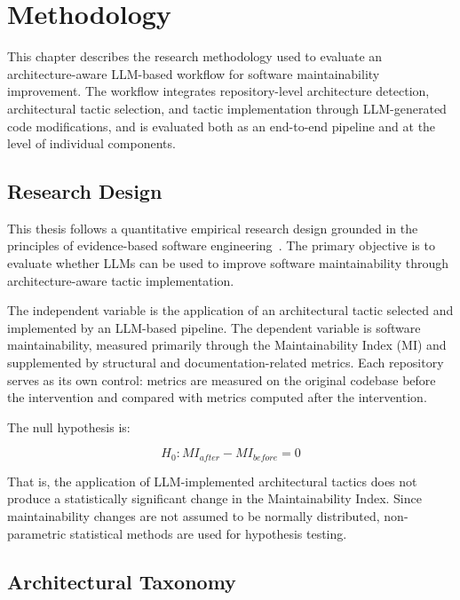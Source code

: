 \chapter{Methodology}
\label{chap:met}

This chapter describes the research methodology used to evaluate an architecture-aware LLM-based workflow for software maintainability improvement. The workflow integrates repository-level architecture detection, architectural tactic selection, and tactic implementation through LLM-generated code modifications, and is evaluated both as an end-to-end pipeline and at the level of individual components.

\section{Research Design}

This thesis follows a quantitative empirical research design grounded in the principles of evidence-based software engineering~\cite{bass2021software}. The primary objective is to evaluate whether LLMs can be used to improve software maintainability through architecture-aware tactic implementation.

The independent variable is the application of an architectural tactic selected and implemented by an LLM-based pipeline. The dependent variable is software maintainability, measured primarily through the Maintainability Index (MI) and supplemented by structural and documentation-related metrics. Each repository serves as its own control: metrics are measured on the original codebase before the intervention and compared with metrics computed after the intervention.

The null hypothesis is:

\begin{equation}
H_0: MI_{after} - MI_{before} = 0
\end{equation}

That is, the application of LLM-implemented architectural tactics does not produce a statistically significant change in the Maintainability Index. Since maintainability changes are not assumed to be normally distributed, non-parametric statistical methods are used for hypothesis testing.

\section{Architectural Taxonomy}
\label{sec:met_taxonomy}

